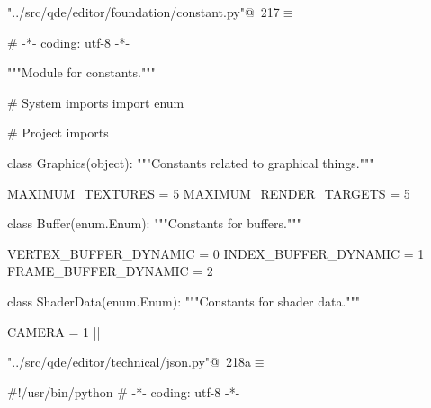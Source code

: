 \documentclass[%
    a4paper,    %
    justified,  %
    nobib,      %
    openany     %
]{tufte-book}
\makeatletter
\renewcommand{\label}[1]{\@tufte@label{##1}}%
\makeatother
\begin{document}
\begin{fullwidth}
\begin{flushleft}
\begin{minipage}{\linewidth}
\begin{list}{}{\setlength{\itemsep}{-\parsep}\setlength{\itemindent}{-\leftmargin}}
\item{}
\end{list}
\end{minipage}\vspace{4ex}
\end{flushleft}

\begin{flushleft} \small
\begin{minipage}{\linewidth}\label{scrap221}\raggedright\small
{} \verb@"../src/qde/editor/foundation/constant.py"@\nobreak\ {\footnotesize {217}}$\equiv$
\vspace{-1ex}
\begin{pythoncode}
# -*- coding: utf-8 -*-

"""Module for constants."""

# System imports
import enum

# Project imports


class Graphics(object):
    """Constants related to graphical things."""

    MAXIMUM_TEXTURES       = 5
    MAXIMUM_RENDER_TARGETS = 5


class Buffer(enum.Enum):
    """Constants for buffers."""

    VERTEX_BUFFER_DYNAMIC = 0
    INDEX_BUFFER_DYNAMIC  = 1
    FRAME_BUFFER_DYNAMIC  = 2


class ShaderData(enum.Enum):
    """Constants for shader data."""

    CAMERA = 1
|\NWsep|
\end{pythoncode}
\vspace{1.5ex}
\footnotesize
\begin{list}{}{\setlength{\itemsep}{-\parsep}\setlength{\itemindent}{-\leftmargin}}

\item{}
\end{list}
\end{minipage}\vspace{4ex}
\end{flushleft}

\begin{flushleft} \small
\begin{minipage}{\linewidth}\label{scrap222}\raggedright\small
{} \verb@"../src/qde/editor/technical/json.py"@\nobreak\ {\footnotesize {218a}}$\equiv$
\vspace{-1ex}
\begin{pythoncode}
#!/usr/bin/python
# -*- coding: utf-8 -*-


\end{pythoncode}
\end{minipage}
\end{flushleft}
\end{fullwidth}
\end{document}
